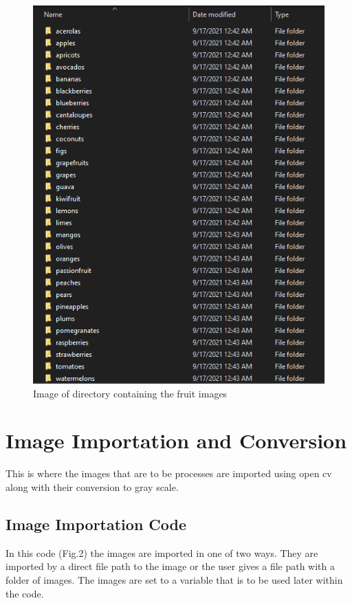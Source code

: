 \documentclass[conference]{IEEEtran}
\begin{document}
\begin{figure}[h]
  \centering
  \includegraphics[width=\linewidth]{image_folder.png}
  \caption{Image of directory containing the fruit images}
\end{figure}

\section{Image Importation and Conversion}
This is where the images that are to be processes are imported using open cv along with their conversion to gray scale.

\subsection{Image Importation Code}\label{AA}
In this code (Fig.2) the images are imported in one of two ways. They are imported by a direct file path to the image or the user gives a file path with a folder of images. The images are set to a variable that is to be used later within the code.
\end{document}
